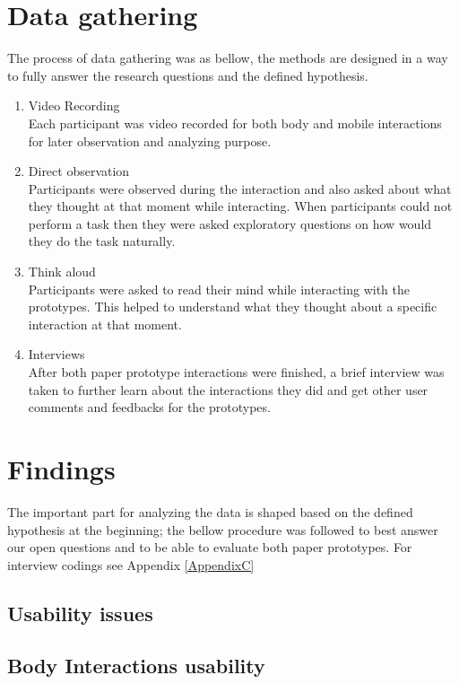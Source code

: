 \section{Data gathering}
The process of data gathering was as bellow, the methods are designed in a way to fully answer the research questions and the defined hypothesis.


\begin{enumerate}
\item Video Recording \\
Each participant was video recorded for both body and mobile interactions for later observation and analyzing purpose. 

\item Direct observation \\
Participants were observed during the interaction and also asked about what they thought at that moment while interacting. When participants could not perform a task then they were asked exploratory questions on how would they do the task naturally.

\item Think aloud \\
Participants were asked to read their mind while interacting with the prototypes. This helped to understand what they thought about a specific interaction at that moment. 

\item Interviews \\
After both paper prototype interactions were finished, a brief interview was taken to further learn about the interactions they did and get other user comments and feedbacks for the prototypes.
\end{enumerate}


\section{Findings}
The important part for analyzing the data is shaped based on the defined hypothesis at the beginning; the bellow procedure was followed to best answer our open questions and to be able to evaluate both paper prototypes. For interview codings see Appendix \ref{AppendixC}


\subsection{Usability issues}


\subsection{Body Interactions usability}

